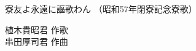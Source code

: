 \documentclass[10pt,b5j]{tarticle} %
\begin{document}
\begin{minipage}[c]{0.7\hsize} %
    \begin{center}
        {\LARGE
            寮友よ永遠に謳歌わん %
        }
        {\small 
            （昭和57年閉寮記念寮歌） %
        }
    \end{center}
\end{minipage}
\begin{minipage}[c]{0.3\hsize} %
    \begin{flushright} %
        植木貴昭君 作歌\\串田厚司君 作曲 %
    \end{flushright}
\end{minipage}
\end{document}
